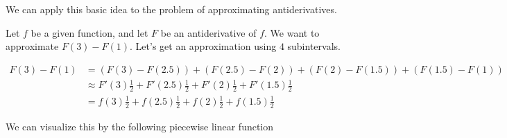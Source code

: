 \documentclass{ximera}
\begin{document}
We can apply this basic idea to the problem of approximating
antiderivatives.

\begin{example}
  Let $f$ be a given function, and let $F$ be an antiderivative of $f$.  We want to approximate $F(3) - F(1)$.  Let's get an approximation using $4$ subintervals.
  
  \begin{align*}F(3) - F(1) &= (F(3) - F(2.5))+(F(2.5) - F(2))+(F(2) - F(1.5))+(F(1.5) - F(1))\\
  &\approx F'(3)\frac{1}{2}+F'(2.5)\frac{1}{2}+F'(2)\frac{1}{2}+F'(1.5)\frac{1}{2}\\
  &=f(3)\frac{1}{2}+f(2.5)\frac{1}{2}+f(2)\frac{1}{2}+f(1.5)\frac{1}{2}
  \end{align*}
  
  We can visualize this by the following piecewise linear function
  
\end{example}
\end{document}
